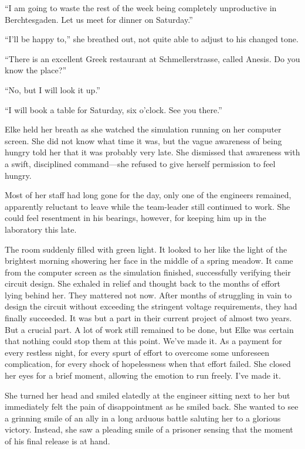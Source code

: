 ``I am going to waste the rest of the week being completely unproductive in Berchtesgaden. Let us meet for dinner on Saturday.''

``I'll be happy to,'' she breathed out, not quite able to adjust to his changed tone.

``There is an excellent Greek restaurant at Schmellerstrasse, called Anesis. Do you know the place?''

``No, but I will look it up.''

``I will book a table for Saturday, six o'clock. See you there.''

\sectionline

Elke held her breath as she watched the simulation running on her computer screen. She did not know what time it was, but the vague awareness of being hungry told her that it was probably very late. She dismissed that awareness with a swift, disciplined command---she refused to give herself permission to feel hungry.

Most of her staff had long gone for the day, only one of the engineers remained, apparently reluctant to leave while the team-leader still continued to work. She could feel resentment in his bearings, however, for keeping him up in the laboratory this late.

The room suddenly filled with green light. It looked to her like the light of the brightest morning showering her face in the middle of a spring meadow. It came from the computer screen as the simulation finished, successfully verifying their circuit design. She exhaled in relief and thought back to the months of effort lying behind her. They mattered not now. After months of struggling in vain to design the circuit without exceeding the stringent voltage requirements, they had finally succeeded. It was but a part in their current project of almost two years. But a crucial part. A lot of work still remained to be done, but Elke was certain that nothing could stop them at this point. We've made it. As a payment for every restless night, for every spurt of effort to overcome some unforeseen complication, for every shock of hopelessness when that effort failed. She closed her eyes for a brief moment, allowing the emotion to run freely. I've made it.

She turned her head and smiled elatedly at the engineer sitting next to her but immediately felt the pain of disappointment as he smiled back. She wanted to see a grinning smile of an ally in a long arduous battle saluting her to a glorious victory. Instead, she saw a pleading smile of a prisoner sensing that the moment of his final release is at hand.


